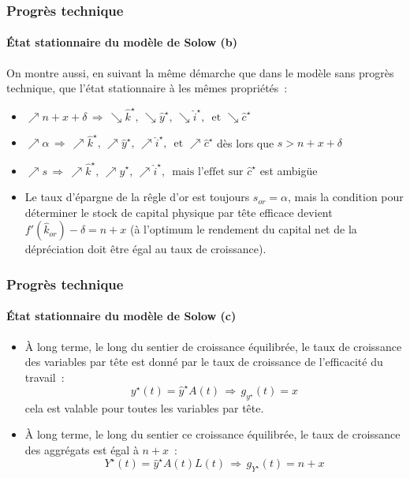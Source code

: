 \documentclass[10pt,notheorems]{beamer}
\theoremstyle{plain}
\theoremstyle{definition} %
\begin{document}
\begin{frame}
  \frametitle{Progrès technique}
  \framesubtitle{État stationnaire du modèle de Solow (b)}

  \bigskip

  On montre aussi, en suivant la même démarche que dans le modèle sans progrès technique, que l'état stationnaire à les mêmes propriétés~:\newline

  \begin{itemize}

  \item $\nearrow n+x+\delta \,\Rightarrow\, \searrow\hat k^{\star},\, \searrow\hat y^{\star},\, \searrow\hat i^{\star},\, \text{ et }\searrow\hat c^{\star}$\newline

  \item $\nearrow \alpha \,\Rightarrow\, \nearrow\hat k^{\star},\, \nearrow\hat y^{\star},\, \nearrow\hat i^{\star},\, \text{ et }\nearrow\hat c^{\star}$ dès lors que $s>n+x+\delta$\newline

  \item $\nearrow s \,\Rightarrow\, \nearrow\hat k^{\star},\, \nearrow\hat y^{\star},\, \nearrow\hat i^{\star},\, \text{ mais l'effet sur } \hat c^{\star}$ est ambigüe\newline

  \item Le taux d'épargne de la rêgle d'or est toujours $s_{or} = \alpha$, mais la condition pour déterminer le stock de capital physique par tête efficace devient $f'(\hat k_{or}) - \delta  = n + x$ (à l'optimum le rendement du capital net de la dépréciation doit être égal au taux de croissance).
  \end{itemize}

\end{frame}


\begin{frame}
  \frametitle{Progrès technique}
  \framesubtitle{État stationnaire du modèle de Solow (c)}

  \bigskip

  \begin{itemize}

  \item À long terme, le long du sentier de croissance équilibrée, le
    taux de croissance des variables par tête est donné par le taux
    de croissance de l'efficacité du travail~:
    \[
      y^{\star}(t) = \hat y^{\star} A(t)\, \Rightarrow\, g_{y^{\star}}(t) = x
    \]
    cela est valable pour toutes les variables par tête.\newline

  \item À long terme, le long du sentier ce croissance équilibrée, le taux de croissance des aggrégats est égal à $n+x$~:
    \[
      Y^{\star}(t) = \hat y^{\star} A(t)L(t)\, \Rightarrow\, g_{Y^{\star}}(t) = n+x
    \]

  \end{itemize}

\end{frame}
\end{document}
